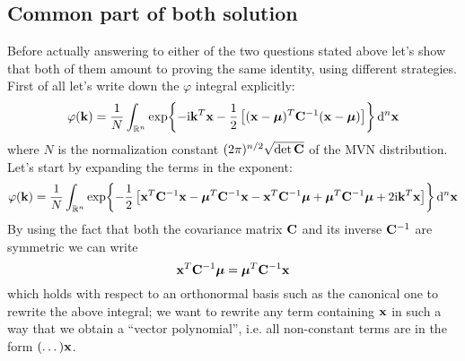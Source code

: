 \documentclass[a4paper]{article}
\newcommand{\R}{\mathbb{R}}
\newcommand{\mat}[1]{\vb{#1}}
\newcommand{\quadre}[1]{\left[ {#1} \right]}
\let\temp\phi%
\let\phi\varphi
\let\varphi\temp
\renewcommand{\i}{\mathrm{i}} %
\begin{document}
\subsection{Common part of both solution}
Before actually answering to either of the two questions stated above let's show that both of them amount to proving the same identity, using different strategies.\\
First of all let's write down the $\phi$ integral explicitly:
\begin{equation*}
    \phi (\vb{k}) = \frac{1}{N} \int_{\R^n} \exp{-\i \vb{k}^T\vb{x} -\frac{1}{2}\quadre{(\vb{x}-\vb*{\mu})^T \mat{C}^{-1} (\vb{x}-\vb*{\mu})}} \dd[n]{\vb{x}}
\end{equation*}
where $N$ is the normalization constant $(2\pi)^{n/2}\sqrt{\det \mat{C}}$ of the MVN distribution.
Let's start by expanding the terms in the exponent:
\begin{equation*}
    \phi (\vb{k}) = \frac{1}{N} \int_{\R^n} \exp{-\frac{1}{2} \quadre{\vb{x}^T\mat{C}^{-1}\vb{x} -\vb*{\mu}^T\mat{C}^{-1}\vb{x} -\vb{x}^T \mat{C}^{-1}\vb*{\mu} + \vb*{\mu}^T \mat{C}^{-1}\vb*{\mu} +2\i \vb{k}^T \vb{x}}} \dd[n]{\vb{x}}
\end{equation*}
By using the fact that both the covariance matrix $\mat{C}$ and its inverse $\mat{C}^{-1}$ are symmetric we can write
\begin{equation*}
    \vb{x}^T \mat{C}^{-1} \vb*{\mu} = \vb*{\mu}^T \mat{C}^{-1} \vb{x}
\end{equation*}
which holds with respect to an orthonormal basis such as the canonical one to rewrite the above integral; we want to rewrite any term containing $\vb{x}$ in such a way that we obtain a ``vector polynomial'', i.e. all non-constant terms are in the form $(\dots)\vb{x}$.
\end{document}
